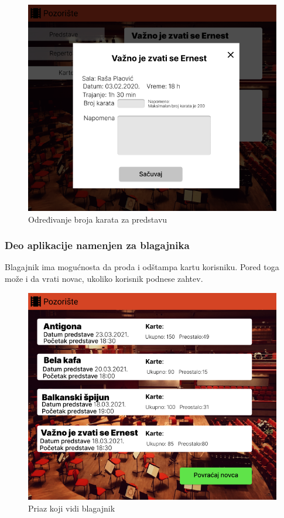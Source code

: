 \documentclass[a4paper]{article}
\begin{document}
\begin{figure}[H]
  \begin{center}
    \includegraphics[width=130mm]{../images/organizator_dodela_karata.png}
  \end{center}
  \caption{Određivanje broja karata za predstavu}
  \label{organizator_dodela_karata}
\end{figure}


\subsubsection{Deo aplikacije namenjen za blagajnika}
Blagajnik ima mogućnosta da proda i odštampa kartu korisniku. Pored toga može i da vrati novac, ukoliko korisnik podnese zahtev.

\begin{figure}[H]
  \begin{center}
    \includegraphics[width=130mm]{../images/blagajnik.png}
  \end{center}
  \caption{Priaz koji vidi blagajnik}
  \label{blagajnik}
\end{figure}
\end{document}
